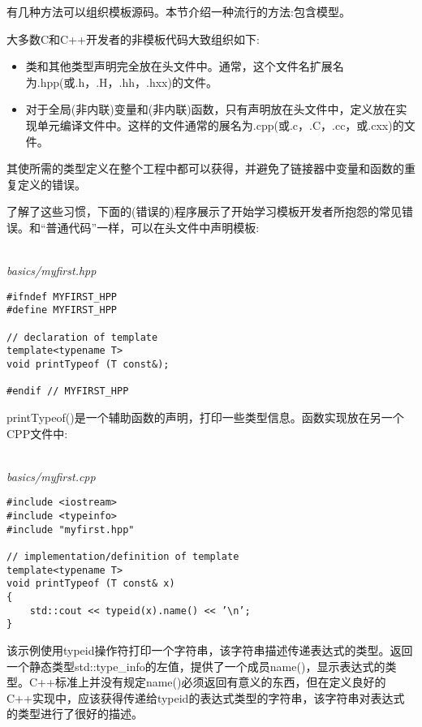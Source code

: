 

有几种方法可以组织模板源码。本节介绍一种流行的方法:包含模型。


大多数C和C++开发者的非模板代码大致组织如下:

\begin{itemize}
\item
类和其他类型声明完全放在头文件中。通常，这个文件名扩展名为.hpp(或.h，.H，.hh，.hxx)的文件。

\item
对于全局(非内联)变量和(非内联)函数，只有声明放在头文件中，定义放在实现单元编译文件中。这样的文件通常的展名为.cpp(或.c，.C，.cc，或.cxx)的文件。
\end{itemize}

其使所需的类型定义在整个工程中都可以获得，并避免了链接器中变量和函数的重复定义的错误。

了解了这些习惯，下面的(错误的)程序展示了开始学习模板开发者所抱怨的常见错误。和“普通代码”一样，可以在头文件中声明模板:

\hspace*{\fill} \\ %
\noindent
\textit{basics/myfirst.hpp}
\begin{lstlisting}[style=styleCXX]
#ifndef MYFIRST_HPP
#define MYFIRST_HPP

// declaration of template
template<typename T>
void printTypeof (T const&);

#endif // MYFIRST_HPP
\end{lstlisting}

printTypeof()是一个辅助函数的声明，打印一些类型信息。函数实现放在另一个CPP文件中:

\hspace*{\fill} \\ %
\noindent
\textit{basics/myfirst.cpp}
\begin{lstlisting}[style=styleCXX]
#include <iostream>
#include <typeinfo>
#include "myfirst.hpp"

// implementation/definition of template
template<typename T>
void printTypeof (T const& x)
{
	std::cout << typeid(x).name() << ’\n’;
}
\end{lstlisting}

该示例使用typeid操作符打印一个字符串，该字符串描述传递表达式的类型。返回一个静态类型std::type\_info的左值，提供了一个成员name()，显示表达式的类型。C++标准上并没有规定name()必须返回有意义的东西，但在定义良好的C++实现中，应该获得传递给typeid的表达式类型的字符串，该字符串对表达式的类型进行了很好的描述。
 
